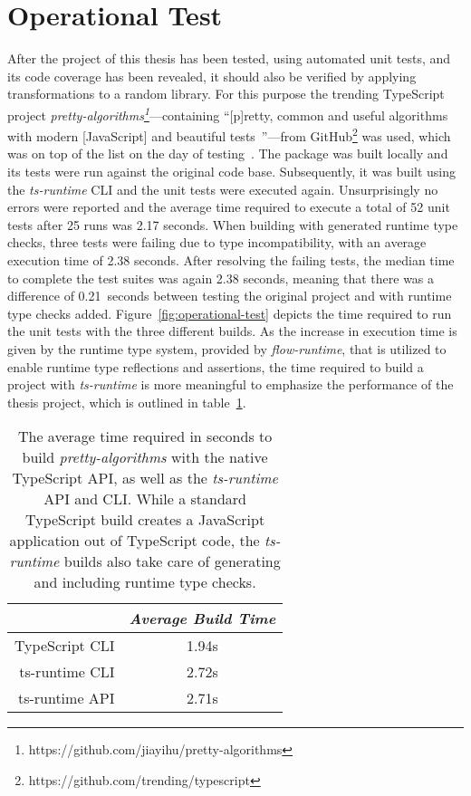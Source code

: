 
\section{Operational Test}
\label{sec:operational-test}

After the project of this thesis has been tested, using automated unit tests, and its code coverage has been revealed, it should also be verified by applying transformations to a random library. For this purpose the trending TypeScript project \emph{pretty-algorithms\footnote{https://github.com/jiayihu/pretty-algorithms}}---containing ``[p]retty, common and useful algorithms with modern [JavaScript] and beautiful tests~\cite{Evaluation:pretty-algorithms}''---from GitHub\footnote{https://github.com/trending/typescript} was used, which was on top of the list on the day of testing~\cite{GitHub:Trending:Archive}. The package was built locally and its tests were run against the original code base. Subsequently, it was built using the \emph{ts-runtime} CLI and the unit tests were executed again. Unsurprisingly no errors were reported and the average time required to execute a total of 52 unit tests after 25 runs was 2.17 seconds. When building with generated runtime type checks, three tests were failing due to type incompatibility, with an average execution time of 2.38 seconds. After resolving the failing tests, the median time to complete the test suites was again 2.38 seconds, meaning that there was a difference of 0.21 seconds between testing the original project and with runtime type checks added. Figure~\ref{fig:operational-test} depicts the time required to run the unit tests with the three different builds. As the increase in execution time is given by the runtime type system, provided by \emph{flow-runtime}, that is utilized to enable runtime type reflections and assertions, the time required to build a project with \emph{ts-runtime} is more meaningful to emphasize the performance of the thesis project, which is outlined in table~\ref{tab:build-time}.
\begin{table}
\caption{The average time required in seconds to build \emph{pretty-algorithms} with the native TypeScript API, as well as the \emph{ts-runtime} API and CLI. While a standard TypeScript build creates a JavaScript application out of TypeScript code, the \emph{ts-runtime} builds also take care of generating and including runtime type checks.}
\label{tab:build-time}
\centering
\setlength{\tabcolsep}{5mm}
\def\arraystretch{1.25}
\small
\begin{tabular}{|r||c|}
    \hline
    & \emph{Average Build Time} \\
    \hline
    \hline
    TypeScript CLI & 1.94s \\
    \hline
    ts-runtime CLI & 2.72s \\
    \hline
    ts-runtime API & 2.71s \\
    \hline
  \end{tabular}
\end{table}
